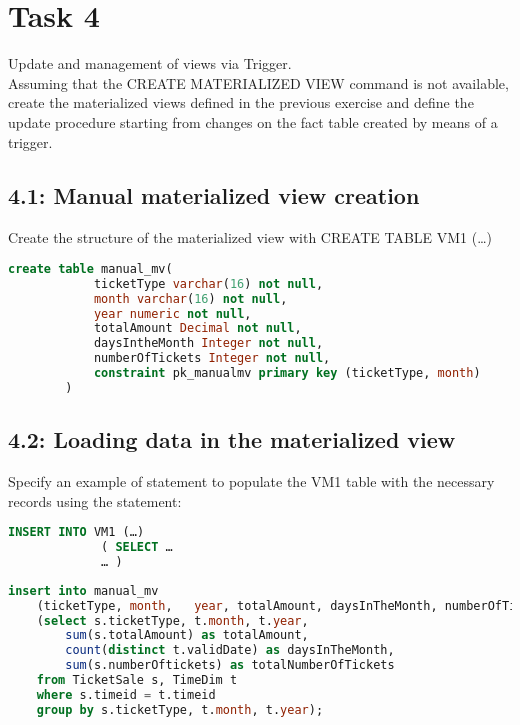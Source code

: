\usepackage{listings}\section{Task 4}

\begin{question}
    Update and management of views via Trigger.\\
    Assuming that the CREATE MATERIALIZED VIEW command is not available, create the
    materialized views defined in the previous exercise and define the update procedure
    starting from changes on the fact table created by means of a trigger.
\end{question}

\subsection{4.1: Manual materialized view creation}

\begin{question}
    Create the structure of the materialized view with CREATE TABLE VM1 (…)
\end{question}
    \begin{lstlisting}[language = SQL]
        create table manual_mv(
            ticketType varchar(16) not null,
            month varchar(16) not null,
            year numeric not null,
            totalAmount Decimal not null,
            daysIntheMonth Integer not null,
            numberOfTickets Integer not null,
            constraint pk_manualmv primary key (ticketType, month)
        )
    \end{lstlisting}
\begin{answer}
\end{answer}

\subsection{4.2: Loading data in the materialized view}

\begin{question}
     Specify an example of statement to populate the VM1 table with the necessary
records using the statement:
    \begin{lstlisting}[language = SQL]
         INSERT INTO VM1 (…)
             ( SELECT …
             … )
    \end{lstlisting}

\end{question}

\begin{answer}
    \begin{lstlisting}[language = SQL]
insert into manual_mv
    (ticketType, month,   year, totalAmount, daysInTheMonth, numberOfTickets)
    (select s.ticketType, t.month, t.year,
        sum(s.totalAmount) as totalAmount,
        count(distinct t.validDate) as daysInTheMonth,
        sum(s.numberOftickets) as totalNumberOfTickets
    from TicketSale s, TimeDim t
    where s.timeid = t.timeid
    group by s.ticketType, t.month, t.year);
    \end{lstlisting}
\end{answer}

